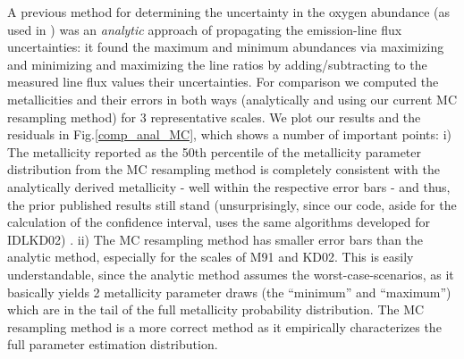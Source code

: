 \documentclass{emulateapj}
\begin{document}
A previous method for determining the uncertainty in the oxygen abundance (as used in \citealt{modjaz08_Z,kewley10,rupke10,modjaz11}) was an \emph{analytic} approach of propagating the emission-line flux uncertainties: it found the maximum and minimum abundances via maximizing and minimizing and maximizing the line ratios by adding/subtracting to the measured line flux values their uncertainties. For comparison we computed the metallicities and their errors in both ways (analytically and using our current MC resampling method) for 3 representative scales. We plot our results and the residuals in Fig.\ref{comp_anal_MC}, which shows a number of important points: i) The metallicity reported as the 50th percentile of the metallicity parameter distribution from the MC resampling method is completely consistent with the analytically derived metallicity -  well within the respective error bars - and thus, the prior published results still stand (unsurprisingly, since our code, aside for the calculation of the confidence interval, uses the same algorithms developed for IDLKD02)
. ii) The MC resampling method has smaller error bars than the analytic method, especially for the scales of M91 and KD02. This is easily understandable, since the analytic method assumes the worst-case-scenarios, as it basically yields 2 metallicity parameter draws (the ``minimum'' and ``maximum'') which are in the tail of the full metallicity probability distribution. The MC resampling method is a more correct method as it empirically characterizes the full parameter estimation distribution.
\end{document}
